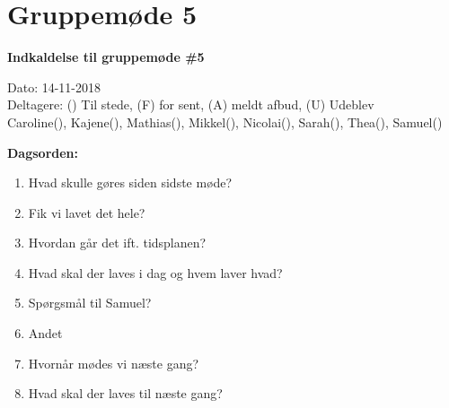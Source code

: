 \section{Gruppemøde 5}

\vspace{0.5 cm}
\textbf{Indkaldelse til gruppemøde \#5}

Dato: 14-11-2018 \\
Deltagere: () Til stede, (F) for sent, (A) meldt afbud, (U) Udeblev \\
Caroline(), Kajene(), Mathias(), Mikkel(), Nicolai(), Sarah(), Thea(), Samuel() 

\vspace{0.1 cm}
\textbf{Dagsorden:}

\begin{enumerate}
	\item Hvad skulle gøres siden sidste møde?
	\item Fik vi lavet det hele?
	\item Hvordan går det ift. tidsplanen?
	\item Hvad skal der laves i dag og hvem laver hvad?
	\item Spørgsmål til Samuel?
	\item Andet
	\item Hvornår mødes vi næste gang?
	\item Hvad skal der laves til næste gang?
\end{enumerate}

